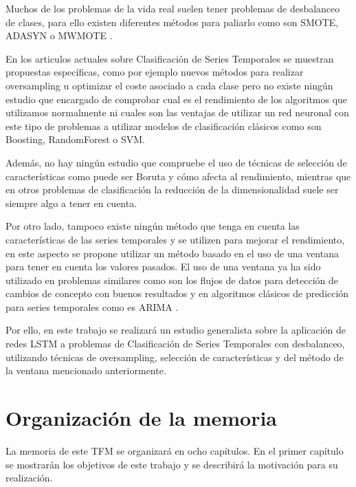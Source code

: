 Muchos de los problemas de la vida real suelen tener problemas de desbalanceo de clases, para ello existen diferentes métodos para paliarlo como son SMOTE, ADASYN o MWMOTE \cite{chawla2002smote,he2008adasyn,barua2012mwmote}.\newline

En los articulos actuales sobre Clasificación de Series Temporales se muestran propuestas específicas, como por ejemplo nuevos métodos para realizar oversampling \cite{liang2013effective} u optimizar el coste asociado a cada clase \cite{roychoudhury2017cost} pero no existe ningún estudio que encargado de comprobar cual es el rendimiento de los algoritmos que utilizamos normalmente ni cuales son las ventajas de utilizar un red neuronal con este tipo de problemas a utilizar modelos de clasificación clásicos como son Boosting, RandomForest o SVM.\newline

Además, no hay ningún estudio que compruebe el uso de técnicas de selección de características como puede ser Boruta y cómo afecta al rendimiento, mientras que en otros problemas de clasificación la reducción de la dimensionalidad suele ser siempre algo a tener en cuenta. \newline

Por otro lado, tampoco existe ningún método que tenga en cuenta las características de las series temporales y se utilizen para mejorar el rendimiento, en este aspecto se propone utilizar un método basado en el uso de una ventana para tener en cuenta los valores pasados. El uso de una ventana ya ha sido utilizado en problemas similares como son los flujos de datos para detección de cambios de concepto \cite{du2014detecting} con buenos resultados y en algoritmos clásicos de predicción para series temporales como es ARIMA \cite{hyndman2018forecasting}.\newline

Por ello, en este trabajo se realizará un estudio generalista sobre la aplicación de redes LSTM a problemas de Clasificación de Series Temporales con desbalanceo, utilizando técnicas de oversampling, selección de características y del método de la ventana mencionado anteriormente.\newline

\section{Organización de la memoria}
La memoria de este TFM se organizará en ocho capítulos. En el primer capítulo se mostrarán los objetivos de este trabajo y se describirá la motivación para su realización.\newline

